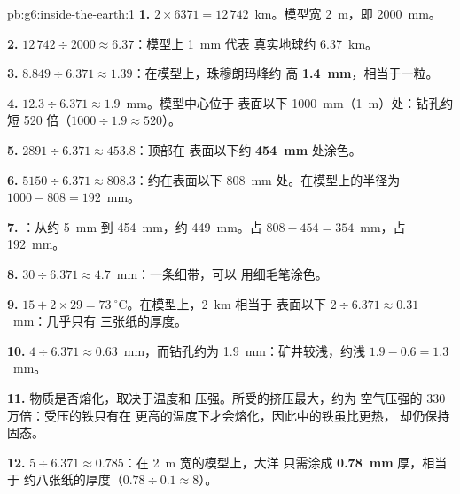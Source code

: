 \begin{solution}{pb:g6:inside-the-earth:1}
\textbf{1.} $2 \times 6371 = 12\,742$~km。模型宽 2~m，即
2000~mm。

\textbf{2.} $12\,742 \div 2000 \approx 6.37$：模型上 1~mm 代表
真实地球约 6.37~km。

\textbf{3.} $8.849 \div 6.371 \approx 1.39$：在模型上，珠穆朗玛峰约
高 \textbf{1.4~mm}，相当于一粒。

\textbf{4.} $12.3 \div 6.371 \approx 1.9$~mm。模型中心位于
表面以下 1000~mm（1~m）处：钻孔约
短 520 倍（$1000 \div 1.9 \approx 520$）。

\textbf{5.} $2891 \div 6.371 \approx 453.8$：顶部在
表面以下约 \textbf{454~mm} 处涂色。

\textbf{6.} $5150 \div 6.371 \approx 808.3$：约在表面以下 808~mm
处。在模型上的半径为 $1000 - 808 = 192$~mm。

\textbf{7.} ：从约 5~mm 到 454~mm，约 449~mm。占 $808 - 454 = 354$~mm，占 192~mm。

\textbf{8.} $30 \div 6.371 \approx 4.7$~mm：一条细带，可以
用细毛笔涂色。

\textbf{9.} $15 + 2 \times 29 = 73~^\circ$C。在模型上，2~km 相当于
表面以下 $2 \div 6.371 \approx 0.31$~mm：几乎只有
三张纸的厚度。

\textbf{10.} $4 \div 6.371 \approx 0.63$~mm，而钻孔约为
1.9~mm：矿井较浅，约浅 $1.9 - 0.6 = 1.3$~mm。

\textbf{11.} 物质是否熔化，取决于温度和
压强。所受的挤压最大，约为
空气压强的 330 万倍：受压的铁只有在
更高的温度下才会熔化，因此中的铁虽比更热，
却仍保持固态。

\textbf{12.} $5 \div 6.371 \approx 0.785$：在 2~m 宽的模型上，大洋
只需涂成 \textbf{0.78~mm} 厚，相当于
约八张纸的厚度（$0.78 \div 0.1 \approx 8$）。
\end{solution}
